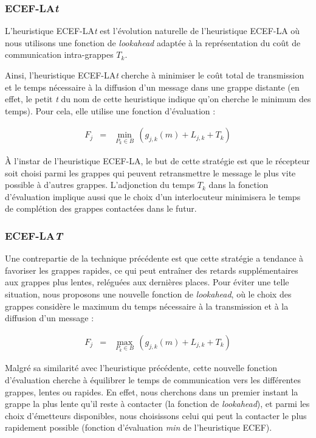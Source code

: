 \subsubsection*{ECEF-LA\emph{t}}

L'heuristique ECEF-LA\emph{t} est l'évolution naturelle de l'heuristique
ECEF-LA où nous utilisons une fonction de \emph{lookahead} adaptée
à la représentation du coût de communication intra-grappes $T_{k}$. 

Ainsi, l'heuristique ECEF-LA\emph{t} cherche à minimiser le coût total
de transmission et le temps nécessaire à la diffusion d'un message
dans une grappe distante (en effet, le \og petit \emph{t} \fg{}
du nom de cette heuristique indique qu'on cherche le minimum des temps).
Pour cela, elle utilise une fonction d'évaluation :

\begin{eqnarray*}
	F_{j} & = & \min_{P_{k}\in B}\,(g_{j,k}(m)+L_{j,k}+T_{k})\end{eqnarray*}


À l'instar de l'heuristique ECEF-LA, le but de cette stratégie est
que le récepteur soit choisi parmi les grappes qui peuvent retransmettre
le message le plus vite possible à d'autres grappes. L'adjonction
du temps $T_{k}$ dans la fonction d'évaluation implique aussi que
le choix d'un interlocuteur minimisera le temps de complétion des
grappes contactées dans le futur. 


\subsubsection*{ECEF-LA\emph{T}}

Une contrepartie de la technique précédente est que cette stratégie
a tendance à favoriser les grappes rapides, ce qui peut entraîner
des retards supplémentaires aux grappes plus lentes, reléguées aux
dernières places. Pour éviter une telle situation, nous proposons
une nouvelle fonction de \emph{lookahead}, où le choix des grappes
considère le maximum du temps nécessaire à la transmission et à la
diffusion d'un message : 

\begin{eqnarray*}
	F_{j} & = & \max_{P_{k}\in B}\,(g_{j,k}(m)+L_{j,k}+T_{k})\end{eqnarray*}


Malgré sa similarité avec l'heuristique précédente, cette nouvelle
fonction d'évaluation cherche à équilibrer le temps de communication
vers les différentes grappes, lentes ou rapides. En effet, nous cherchons
dans un premier instant la grappe la plus lente qu'il reste à contacter
(la fonction de \emph{lookahead}), et parmi les choix d'émetteurs
disponibles, nous choisissons celui qui peut la contacter le plus
rapidement possible (fonction d'évaluation \emph{min} de l'heuristique
ECEF).

